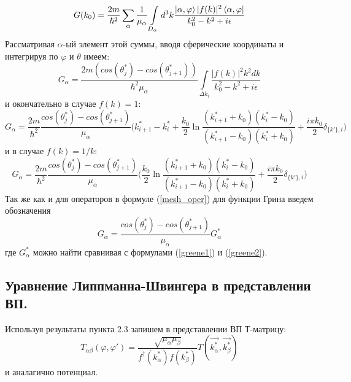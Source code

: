 \documentclass[a4paper,12pt]{article}
\begin{document}
\[
  G(k_0) = 
	\frac{2m}{\hbar^2}  \sum\limits_\alpha \frac{1}{ \mu_\alpha } \int\limits_{D_\alpha} d^3k 
		\frac{ \ket{\alpha,\varphi} |f(k)|^2 \bra{\alpha,\varphi} }{ k_0^2 - k^2 + i\epsilon } 
\]
Рассматривая $\alpha$-ый элемент этой суммы, вводя сферические координаты и интегрируя по $\varphi$ и $\theta$ имеем:
\[
  G_\alpha = \frac{2m (cos(\theta_j^*)-cos(\theta_{j+1}^*))}{\hbar^2 \mu_\alpha} \int\limits_{\Delta k_i}
		\frac{ |f(k)|^2 k^2 dk }{ k_0^2 - k^2 + i\epsilon } 
\]
и окончательно в случае $f(k)=1$:
\begin{equation}
  \label{greene1}
  G_\alpha = \frac{2m}{\hbar^2} \frac{cos(\theta_j^*)-cos(\theta_{j+1}^*)}{\mu_\alpha}
		\bigg( 
			k_{i+1}^* - k_i^* + \frac{k_0}{2}\ln\frac{(k_{i+1}^* +k_0)(k_i^* -k_0)}{(k_{i+1}^* -k_0)(k_i^* +k_0)} + \frac{i\pi k_0}{2}\delta_{\{k'\},i}
		\bigg)
\end{equation}
и в случае $f(k)=1/k$:
\begin{equation}
  \label{greene2}
  G_\alpha = \frac{2m}{\hbar^2} \frac{cos(\theta_j^*)-cos(\theta_{j+1}^*)}{\mu_\alpha} 
		\bigg( 
			\frac{k_0}{2}\ln\frac{(k_{i+1}^* +k_0)(k_i^* -k_0)}{(k_{i+1}^* -k_0)(k_i^* +k_0)} + \frac{i\pi k_0}{2}\delta_{\{k'\},i}
		\bigg)
\end{equation}
Так же как и для операторов в формуле (\ref{mesh_oper}) для функции Грина введем обозначения
\begin{equation}
    \label{mesh_greene}
    G_\alpha = \frac{cos(\theta_j^*)-cos(\theta_{j+1}^*)}{\mu_\alpha} G^*_\alpha
\end{equation} где $G^*_\alpha$ можно найти сравнивая с формулами (\ref{greene1}) и (\ref{greene2}).


\subsection{Уравнение Липпманна-Швингера в представлении ВП.}

Используя результаты пункта 2.3 запишем в представлении ВП Т-матрицу:
\begin{equation}
	T_{\alpha\beta}(\varphi,\varphi') = \frac{\sqrt{\mu_\alpha \mu_\beta}}{ f^\dagger(k_\alpha^*)f(k_\beta^*) } T(\vec{k^*_\alpha},\vec{k^*_\beta})
\end{equation}
и аналагично потенциал.
\end{document}
